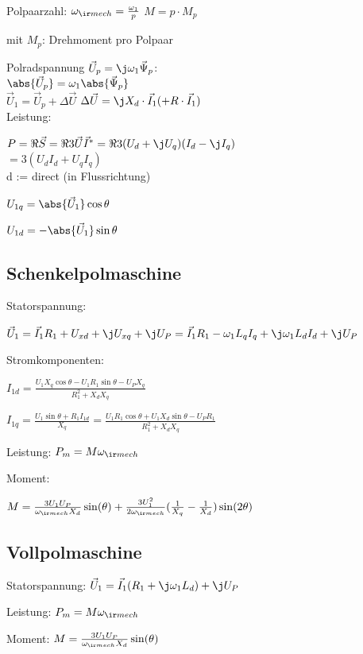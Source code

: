 \documentclass[fs, german]{latex4ei_fs}
\begin{document}
\begin{sectionbox}

Polpaarzahl: $\omega_{\ir mech} = \frac{\omega_1}{p}$ \quad $M = p \cdot M_{p}$ 

mit $M_p$: Drehmoment pro Polpaar

Polradspannung $\vec U_p = \j \omega_1 \vec \Psi_p$: \\

 $\abs{\vec U_p} = \omega_1 \abs{\vec \Psi_p}$\\


 $\vec U_1 = \vec U_p + \Delta \vec U$
 $\Delta \vec U = \j X_d \cdot \vec I_1 (+ R \cdot \vec I_1)$ \\



Leistung:

 $P = \Re{\vec S}  = \Re{ 3 \vec U \vec I^* } = \Re{3( U_d + \j U_q ) (I_d - \j I_q)}$ \\ $= 3 (U_d I_d + U_q I_q)$ \\

 d := direct (in Flussrichtung)

 $U_{1q} = \abs{\vec U_1} \cos \theta$

 $U_{1d} = - \abs{\vec U_1} \sin \theta$
\subsection{Schenkelpolmaschine}

Statorspannung:

$\vec U_1 = \vec I_1 R_1 + U_{xd} + \j U_{xq} + \j U_P = \vec I_1 R_1 - \omega_1 L_q I_q + \j \omega_1 L_d I_d + \j U_P$

Stromkomponenten:

$I_{1d} = \frac{U_1 X_q \cos \theta - U_1 R_1 \sin \theta - U_P X_q}{R_1^2 + X_d X_q}$

$I_{1q} = \frac{U_1 \sin \theta + R_1 I_{1d}}{X_q} = \frac{U_1 R_1 \cos \theta + U_1 X_d \sin \theta - U_P R_1}{R_1^2 + X_d X_q}$ 

Leistung:
 $P_m = M \omega_{\ir mech}$

Moment: 

$M = \frac{3 U_1 U_P}{\omega_{\ir mech} X_d} \sin (\theta ) + \frac{3 U_1^2}{2 \omega_{\ir mech}} (\frac{1}{X_q} - \frac{1}{X_d} ) \sin ( 2 \theta )$

 \subsection{Vollpolmaschine}

Statorspannung:
$\vec U_1 = \vec I_1 (R_1 + \j \omega_1 L_d) + \j U_P$

Leistung:
 $P_m = M \omega_{\ir mech}$

Moment: 
$M = \frac{3 U_1 U_P}{\omega_{\ir mech} X_d} \sin ( \theta ) $
\end{sectionbox}
\end{document}

